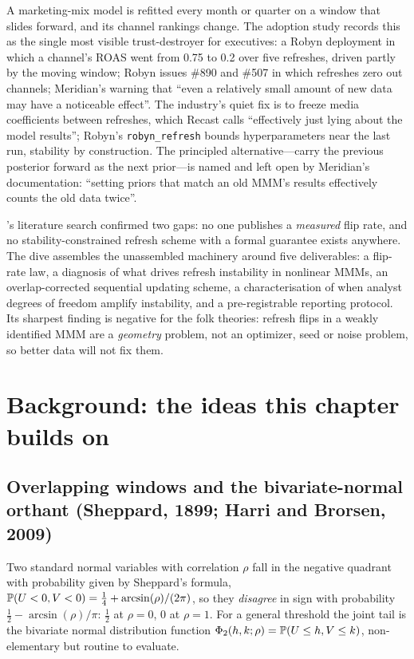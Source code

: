 A marketing-mix model is refitted every month or quarter on a window that slides forward, and its channel rankings change. The adoption study records this as the single most visible trust-destroyer for executives: a Robyn deployment in which a channel's ROAS went from 0.75 to 0.2 over five refreshes, driven partly by the moving window; Robyn issues \#890 and \#507 in which refreshes zero out channels; Meridian's warning that ``even a relatively small amount of new data may have a noticeable effect''. The industry's quiet fix is to freeze media coefficients between refreshes, which Recast calls ``effectively just lying about the model results''; Robyn's \texttt{robyn\_refresh} bounds hyperparameters near the last run, stability by construction. The principled alternative---carry the previous posterior forward as the next prior---is named and left open by Meridian's documentation: ``setting priors that match an old MMM's results effectively counts the old data twice''.

's literature search confirmed two gaps: no one publishes a \emph{measured} flip rate, and no stability-constrained refresh scheme with a formal guarantee exists anywhere. The dive assembles the unassembled machinery around five deliverables: a flip-rate law, a diagnosis of what drives refresh instability in nonlinear MMMs, an overlap-corrected sequential updating scheme, a characterisation of when analyst degrees of freedom amplify instability, and a pre-registrable reporting protocol. Its sharpest finding is negative for the folk theories: refresh flips in a weakly identified MMM are a \emph{geometry} problem, not an optimizer, seed or noise problem, so better data will not fix them.

\section{Background: the ideas this chapter builds on}

\subsection{Overlapping windows and the bivariate-normal orthant (Sheppard, 1899; Harri and Brorsen, 2009)}

Two standard normal variables with correlation $\rho$ fall in the negative quadrant with probability given by Sheppard's formula, $\mathbb{P}(U < 0, V < 0) = \tfrac14 + \arcsin(\rho)/(2\pi)$, so they \emph{disagree} in sign with probability $\tfrac12 - \arcsin(\rho)/\pi$: $\tfrac12$ at $\rho = 0$, $0$ at $\rho = 1$. For a general threshold the joint tail is the bivariate normal distribution function $\Phi_2(h, k; \rho) = \mathbb{P}(U \le h, V \le k)$, non-elementary but routine to evaluate.


